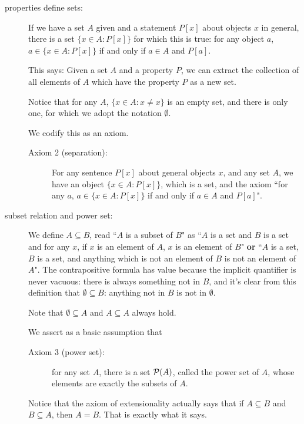 \documentclass[12pt]{article}
\begin{document}
\begin{description}
\item[properties define sets:]  If we have a set $A$ given and a statement $P[x]$ about objects  $x$ in general, there is a set
$\{x \in A:P[x]\}$ for which this is true:  for any object $a$, $a \in \{x \in A:P[x]\}$ if and only if $a \in A$ and $P[a]$.

This says:  Given a set $A$ and a property $P$, we can extract the collection of all elements of $A$ which have the property $P$ as a new set.

Notice that for any $A$, $\{x \in A:x \neq x\}$ is an empty set, and there is only one, for which we adopt the notation $\emptyset$.

We codify this as an axiom.

\begin{description}

\item[Axiom 2 (separation):]  For any sentence $P[x]$ about general objects $x$, and any set $A$, we have
an object $\{x \in A:P[x]\}$, which is a set, and the axiom ``for any $a$, $a \in \{x \in A:P[x]\}$ if and only if $a \in A$ and $P[a]$".

\end{description}

\item[subset relation and power set:]  We define $A \subseteq B$, read ``$A$ is a subset of $B$" as  ``$A$ is a set and $B$ is a set and for any $x$, if $x$ is an element of $A$, $x$ is an element of $B$" {\bf or}  ``$A$ is a set, $B$ is a set, and anything which is not an element of $B$ is not an element of $A$".  The contrapositive formula has value because the implicit quantifier is never vacuous:  there is always something not in $B$, and it's clear from this definition that $\emptyset \subseteq B$:  anything not in $B$ is not in $\emptyset$.

Note that $\emptyset \subseteq A$ and $A \subseteq A$ always hold.

We assert as a basic assumption that 

\begin{description}

\item[Axiom 3 (power set):]  for any set $A$, there is a set ${\cal P}(A)$, called the power set of $A$, whose elements are exactly the subsets of $A$.

\end{description}

Notice that the axiom of extensionality actually says that if $A \subseteq B$ and $B \subseteq A$, then $A = B$.   That is exactly what it says.



\end{description}
\end{document}
